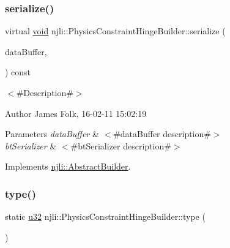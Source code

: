 \subsubsection{\texorpdfstring{serialize()}{serialize()}}
{\footnotesize\ttfamily virtual \mbox{\hyperlink{_thread_8h_af1e856da2e658414cb2456cb6f7ebc66}{void}} njli\+::\+Physics\+Constraint\+Hinge\+Builder\+::serialize (\begin{DoxyParamCaption}\item[{\mbox{\hyperlink{_thread_8h_af1e856da2e658414cb2456cb6f7ebc66}{void}} $\ast$}]{data\+Buffer,  }\item[{bt\+Serializer $\ast$}]{ }\end{DoxyParamCaption}) const\hspace{0.3cm}{\ttfamily [virtual]}}



$<$\#\+Description\#$>$ 

\begin{DoxyAuthor}{Author}
James Folk, 16-\/02-\/11 15\+:02\+:19
\end{DoxyAuthor}

\begin{DoxyParams}{Parameters}
{\em data\+Buffer} & $<$\#data\+Buffer description\#$>$ \\
\hline
{\em bt\+Serializer} & $<$\#bt\+Serializer description\#$>$ \\
\hline
\end{DoxyParams}


Implements \mbox{\hyperlink{classnjli_1_1_abstract_builder_ab66b774e02ccb9da554c9aab7fa6d981}{njli\+::\+Abstract\+Builder}}.

\mbox{\label{classnjli_1_1_physics_constraint_hinge_builder_a630b25a403ccfbf3c0cb3c1372c36817}} 
\subsubsection{\texorpdfstring{type()}{type()}}
{\footnotesize\ttfamily static \mbox{\hyperlink{_util_8h_a10e94b422ef0c20dcdec20d31a1f5049}{u32}} njli\+::\+Physics\+Constraint\+Hinge\+Builder\+::type (\begin{DoxyParamCaption}{ }\end{DoxyParamCaption})\hspace{0.3cm}{\ttfamily [static]}}

